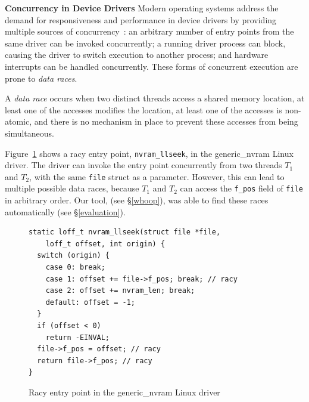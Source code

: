 \noindent\textbf{Concurrency in Device Drivers }
%
Modern operating systems address the demand for responsiveness and performance in device drivers by providing multiple sources of concurrency~\cite{corbet2005linux}: an arbitrary number of entry points from the same driver can be invoked concurrently; a running driver process can block, causing the driver to switch execution to another process; and hardware interrupts can be handled concurrently.  These forms of concurrent execution are prone to \emph{data races}.

\begin{definition}
\label{definition:datarace}
A \emph{data race} occurs when two distinct threads access a shared memory location, at least one of the accesses modifies the location, at least one of the accesses is non-atomic, and there is no mechanism in place to prevent these accesses from being simultaneous.
\end{definition}

Figure~\ref{fig:data_race_example} shows a racy entry point, \texttt{nvram\_llseek}, in the generic\_nvram Linux driver. The driver can invoke the entry point concurrently from two threads $T_1$ and $T_2$, with the same \texttt{file} struct as a parameter. However, this can lead to multiple possible data races, because $T_1$ and $T_2$ can access the \texttt{f\_pos} field of \texttt{file} in arbitrary order. Our tool, \whoop (see \S\ref{whoop}), was able to find these races automatically (see \S\ref{evaluation}).

\begin{figure}[t]
\begin{lstlisting}
static loff_t nvram_llseek(struct file *file,
    loff_t offset, int origin) {
  switch (origin) {
    case 0: break;
    case 1: offset += file->f_pos; break; // racy
    case 2: offset += nvram_len; break;
    default: offset = -1;
  }
  if (offset < 0)
    return -EINVAL;
  file->f_pos = offset; // racy
  return file->f_pos; // racy
}
\end{lstlisting}
\vspace{-2mm}
\caption{Racy entry point in the generic\_nvram Linux driver}
\label{fig:data_race_example}
\vspace{-2mm}
\end{figure}

